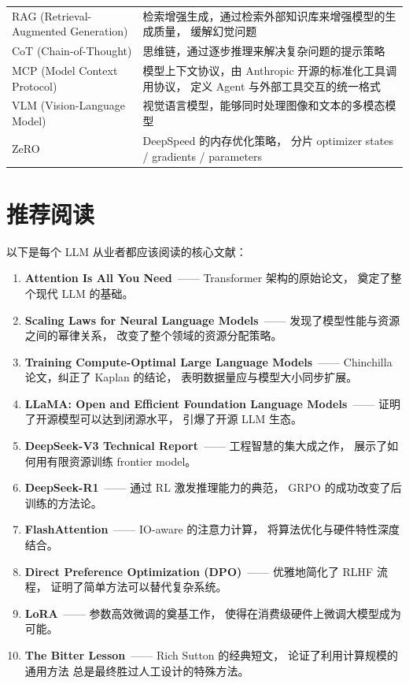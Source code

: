 \begin{table}[H]
\begin{tabularx}{\linewidth}{l X}
RAG (Retrieval-Augmented Generation) &
  检索增强生成，通过检索外部知识库来增强模型的生成质量，
  缓解幻觉问题 \\
CoT (Chain-of-Thought) &
  思维链，通过逐步推理来解决复杂问题的提示策略 \\
MCP (Model Context Protocol) &
  模型上下文协议，由 Anthropic 开源的标准化工具调用协议，
  定义 Agent 与外部工具交互的统一格式 \\
VLM (Vision-Language Model) &
  视觉语言模型，能够同时处理图像和文本的多模态模型 \\
ZeRO &
  DeepSpeed 的内存优化策略，
  分片 optimizer states / gradients / parameters~\cite{rajbhandari2020zero} \\
\bottomrule
\end{tabularx}
\end{table}

\section{推荐阅读}

以下是每个 LLM 从业者都应该阅读的核心文献：

\begin{enumerate}[noitemsep]
  \item \textbf{Attention Is All You Need}~\cite{vaswani2017attention}——
        Transformer 架构的原始论文，
        奠定了整个现代 LLM 的基础。
  \item \textbf{Scaling Laws for Neural Language Models}~\cite{kaplan2020scaling}——
        发现了模型性能与资源之间的幂律关系，
        改变了整个领域的资源分配策略。
  \item \textbf{Training Compute-Optimal Large Language Models}~\cite{hoffmann2022chinchilla}——
        Chinchilla 论文，纠正了 Kaplan 的结论，
        表明数据量应与模型大小同步扩展。
  \item \textbf{LLaMA: Open and Efficient Foundation Language Models}~\cite{touvron2023llama}——
        证明了开源模型可以达到闭源水平，
        引爆了开源 LLM 生态。
  \item \textbf{DeepSeek-V3 Technical Report}~\cite{deepseekv3}——
        工程智慧的集大成之作，
        展示了如何用有限资源训练 frontier model。
  \item \textbf{DeepSeek-R1}~\cite{deepseekr1}——
        通过 RL 激发推理能力的典范，
        GRPO 的成功改变了后训练的方法论。
  \item \textbf{FlashAttention}~\cite{dao2022flashattention}——
        IO-aware 的注意力计算，
        将算法优化与硬件特性深度结合。
  \item \textbf{Direct Preference Optimization (DPO)}~\cite{rafailov2023dpo}——
        优雅地简化了 RLHF 流程，
        证明了简单方法可以替代复杂系统。
  \item \textbf{LoRA}~\cite{hu2021lora}——
        参数高效微调的奠基工作，
        使得在消费级硬件上微调大模型成为可能。
  \item \textbf{The Bitter Lesson}~\cite{sutton2019bitterlesson}——
        Rich Sutton 的经典短文，
        论证了利用计算规模的通用方法
        总是最终胜过人工设计的特殊方法。
\end{enumerate}


